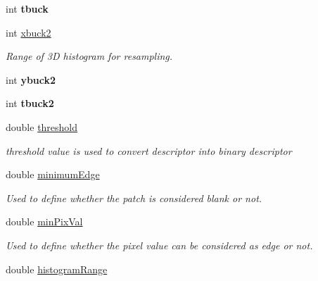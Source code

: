 \begin{DoxyCompactItemize}
\item 
\hypertarget{classDescriptor_afbf37c1c77f5213e7f3bd4864c509262}{int {\bfseries tbuck}}\label{classDescriptor_afbf37c1c77f5213e7f3bd4864c509262}

\item 
\hypertarget{classDescriptor_a7bf833df5a59f820488a0a4347c04be3}{int \hyperlink{classDescriptor_a7bf833df5a59f820488a0a4347c04be3}{xbuck2}}\label{classDescriptor_a7bf833df5a59f820488a0a4347c04be3}

\begin{DoxyCompactList}\small\item\em \-Range of 3\-D histogram for resampling. \end{DoxyCompactList}\item 
\hypertarget{classDescriptor_a7e65d07bbf225deac9506144f839dd22}{int {\bfseries ybuck2}}\label{classDescriptor_a7e65d07bbf225deac9506144f839dd22}

\item 
\hypertarget{classDescriptor_a21dcb75aa90e7142e171067367f53594}{int {\bfseries tbuck2}}\label{classDescriptor_a21dcb75aa90e7142e171067367f53594}

\item 
double \hyperlink{classDescriptor_a17990364a2abbf2c531a2b644be57bf4}{threshold}
\begin{DoxyCompactList}\small\item\em threshold value is used to convert descriptor into binary descriptor \end{DoxyCompactList}\item 
\hypertarget{classDescriptor_a22955c31e2f8dfd48f0d10f1210c2989}{double \hyperlink{classDescriptor_a22955c31e2f8dfd48f0d10f1210c2989}{minimum\-Edge}}\label{classDescriptor_a22955c31e2f8dfd48f0d10f1210c2989}

\begin{DoxyCompactList}\small\item\em \-Used to define whether the patch is considered blank or not. \end{DoxyCompactList}\item 
double \hyperlink{classDescriptor_a64392290391afd9000a085710513c381}{min\-Pix\-Val}
\begin{DoxyCompactList}\small\item\em \-Used to define whether the pixel value can be considered as edge or not. \end{DoxyCompactList}\item 
\hypertarget{classDescriptor_aaf21c8c1f5f0c65d599f3e38b7c23f89}{double \hyperlink{classDescriptor_aaf21c8c1f5f0c65d599f3e38b7c23f89}{histogram\-Range}}\label{classDescriptor_aaf21c8c1f5f0c65d599f3e38b7c23f89}


\end{DoxyCompactItemize}
